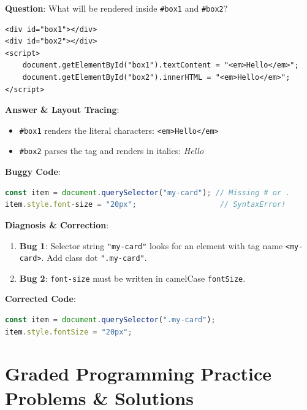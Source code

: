 \begin{outputprediction}
\textbf{Question}: What will be rendered inside \texttt{\#box1} and \texttt{\#box2}?
\begin{lstlisting}[language=HTML5]
<div id="box1"></div>
<div id="box2"></div>
<script>
    document.getElementById("box1").textContent = "<em>Hello</em>";
    document.getElementById("box2").innerHTML = "<em>Hello</em>";
</script>
\end{lstlisting}
\textbf{Answer \& Layout Tracing}:
\begin{itemize}
    \item \texttt{\#box1} renders the literal characters: \texttt{<em>Hello</em>}
    \item \texttt{\#box2} parses the tag and renders in italics: \textit{Hello}
\end{itemize}
\end{outputprediction}

\begin{debuggingbox}
\textbf{Buggy Code}:
\begin{lstlisting}[language=JavaScript]
const item = document.querySelector("my-card"); // Missing # or .
item.style.font-size = "20px";                   // SyntaxError!
\end{lstlisting}
\textbf{Diagnosis \& Correction}:
\begin{enumerate}
    \item \textbf{Bug 1}: Selector string \texttt{"my-card"} looks for an element with tag name \texttt{<my-card>}. Add class dot \texttt{".my-card"}.
    \item \textbf{Bug 2}: \texttt{font-size} must be written in camelCase \texttt{fontSize}.
\end{enumerate}
\textbf{Corrected Code}:
\begin{lstlisting}[language=JavaScript]
const item = document.querySelector(".my-card");
item.style.fontSize = "20px";
\end{lstlisting}
\end{debuggingbox}

\section{Graded Programming Practice Problems \& Solutions}

